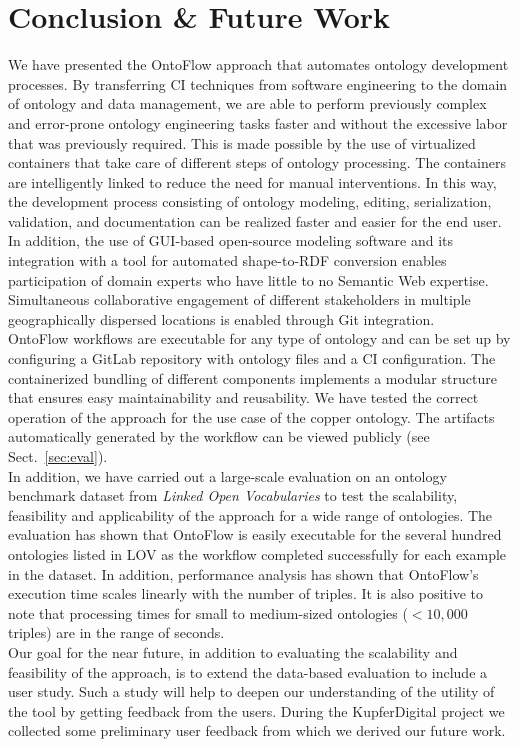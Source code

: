 \documentclass[runningheads]{llncs}
\begin{document}
\section{Conclusion \& Future Work}\label{sec:final}
We have presented the OntoFlow approach that automates ontology development processes. By transferring CI techniques from software engineering to the domain of ontology and data management, we are able to perform previously complex and error-prone ontology engineering tasks faster and without the excessive labor that was previously required. This is made possible by the use of virtualized containers that take care of different steps of ontology processing. The containers are intelligently linked to reduce the need for manual interventions. In this way, the development process consisting of ontology modeling, editing, serialization, validation, and documentation can be realized faster and easier for the end user. In addition, the use of GUI-based open-source modeling software and its integration with a tool for automated shape-to-RDF conversion enables participation of domain experts who have little to no Semantic Web expertise. Simultaneous collaborative engagement of different stakeholders in multiple geographically dispersed locations is enabled through Git integration.\\
OntoFlow workflows are executable for any type of ontology and can be set up by configuring a GitLab repository with ontology files and a CI configuration. The containerized bundling of different components implements a modular structure that ensures easy maintainability and reusability. We have tested the correct operation of the approach for the use case of the copper ontology. The artifacts automatically generated by the workflow can be viewed publicly (see Sect.~\ref{sec:eval}).\\
In addition, we have carried out a large-scale evaluation on an ontology benchmark dataset from \textit{Linked Open Vocabularies} to test the scalability, feasibility and applicability of the approach for a wide range of ontologies. The evaluation has shown that OntoFlow is easily executable for the several hundred ontologies listed in LOV as the workflow completed successfully for each example in the dataset. In addition, performance analysis has shown that OntoFlow's execution time scales linearly with the number of triples. It is also positive to note that processing times for small to medium-sized ontologies ($< 10,000$ triples) are in the range of seconds.\\
Our goal for the near future, in addition to evaluating the scalability and feasibility of the approach, is to extend the data-based evaluation to include a user study. Such a study will help to deepen our understanding of the utility of the tool by getting feedback from the users. During the KupferDigital project we collected some preliminary user feedback from which we derived our future work.   
\end{document}
